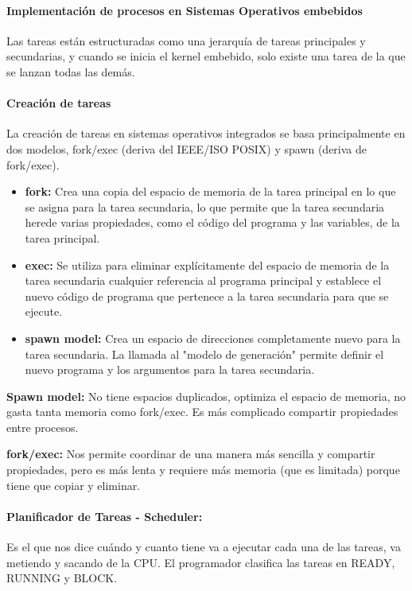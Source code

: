 \documentclass[12pt, twoside, openright]{report} %
\begin{document}
\begin{description}
	      \paragraph{Implementación de procesos en Sistemas Operativos embebidos}

	      Las tareas están estructuradas como una jerarquía de tareas principales y secundarias, y cuando se inicia el kernel embebido, solo existe una tarea de la que se lanzan todas las demás.


	      \paragraph{Creación de tareas}
	      La creación de tareas en sistemas operativos integrados se basa principalmente en dos modelos, fork/exec (deriva del IEEE/ISO POSIX) y spawn (deriva de fork/exec).

	      \begin{itemize}
		      \item \textbf{fork:} Crea una copia del espacio de memoria de la tarea principal en lo que se asigna para la tarea secundaria, lo que permite que la tarea secundaria herede varias propiedades, como el código del programa y las variables, de la tarea principal.
		      \item \textbf{exec:} Se utiliza para eliminar explícitamente del espacio de memoria de la tarea secundaria cualquier referencia al programa principal y establece el nuevo código de programa que pertenece a la tarea secundaria para que se ejecute.
		      \item \textbf{spawn model:} Crea un espacio de direcciones completamente nuevo para la tarea secundaria. La llamada al "modelo de generación" permite definir el nuevo programa y los argumentos para la tarea secundaria.
	      \end{itemize}

	      \textbf{Spawn model:} No tiene espacios duplicados, optimiza el espacio de memoria, no gasta tanta memoria como fork/exec. Es más complicado compartir propiedades entre procesos.

	      \textbf{fork/exec:} Nos permite coordinar de una manera más sencilla y compartir propiedades, pero es más lenta y requiere más memoria (que es limitada) porque tiene que copiar y eliminar.

	      \paragraph{Planificador de Tareas - Scheduler:} Es el que nos dice cuándo y cuanto tiene va a ejecutar cada una de las tareas, va metiendo y sacando de la CPU. El programador clasifica las tareas en READY, RUNNING y BLOCK.


\end{description}
\end{document}
